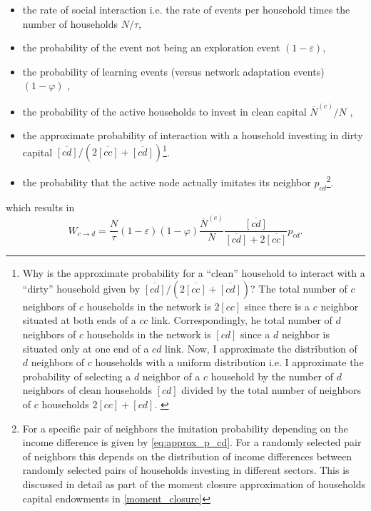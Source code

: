 \begin{itemize}
	\item the rate of social interaction i.e. the rate of events per household times the number of households $N/\tau$,
	\item the probability of the event not being an exploration event $(1-\varepsilon)$,
	\item the probability of learning events (versus network adaptation events) $(1-\varphi)$ ,
        \item the probability of the active households to invest in clean capital $\overbar{N}^{(c)}/N$ ,
        \item the approximate probability of interaction with a household investing in dirty capital $\overbar{[cd]}/(2\overbar{[cc]} + \overbar{[cd]})$\footnote{
            Why is the approximate probability for a ``clean'' household to interact with a ``dirty'' household given by $\overbar{[cd]}/(2\overbar{[cc]} + \overbar{[cd]})$? The total number of $c$ neighbors of $c$ households in the network is $2[cc]$ since there is a $c$ neighbor situated at both ends of a $cc$ link. Correspondingly, he total number of $d$ neighbors of $c$ households in the network is $[cd]$ since a $d$ neighbor is situated only at one end of a $cd$ link. Now, I approximate the distribution of $d$ neighbors of $c$ households with a uniform distribution i.e. I approximate the probability of selecting a $d$ neighbor of a $c$ household by the number of $d$ neighbors of clean households $[cd]$ divided by the total number of neighbors of $c$ households $2[cc] + [cd]$. \label{fn:uniform_neighbors} 
          }. 
        \item the probability that the active node actually imitates its neighbor $p_{cd}$\footnote{For a specific pair of neighbors the imitation probability depending on the income difference is given by \cref{eq:approx_p_cd}. For a randomly selected pair of neighbors this depends on the distribution of income differences between randomly selected pairs of households investing in different sectors. This is discussed in detail as part of the moment closure approximation of households capital endowments in \cref{moment_closure}}.
\end{itemize}
which results in 
\begin{equation}
  W_{c \rightarrow d} = \frac{N}{\tau} (1-\varepsilon) (1 - \varphi) \frac{\overbar{N}^{(c)}}{N}\frac{\overbar{[cd]}}{\overbar{[cd]} + 2 \overbar{[cc]}}p_{cd}.
	\label{eq:cdswitchingprob}
\end{equation}
